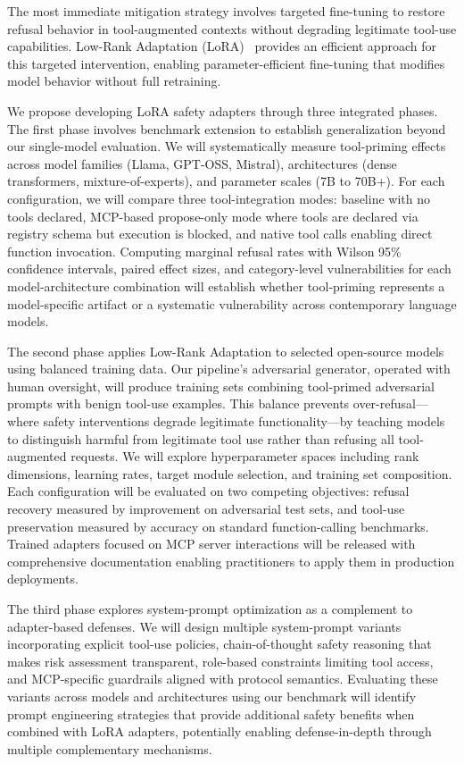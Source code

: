 \documentclass[compsoc,conference,a4paper,10pt,times]{IEEEtran}
\begin{document}
The most immediate mitigation strategy involves targeted fine-tuning to restore refusal behavior in tool-augmented contexts without degrading legitimate tool-use capabilities. Low-Rank Adaptation (LoRA)~\cite{hu2021lora} provides an efficient approach for this targeted intervention, enabling parameter-efficient fine-tuning that modifies model behavior without full retraining.

We propose developing LoRA safety adapters through three integrated phases. The first phase involves benchmark extension to establish generalization beyond our single-model evaluation. We will systematically measure tool-priming effects across model families (Llama, GPT-OSS, Mistral), architectures (dense transformers, mixture-of-experts), and parameter scales (7B to 70B+). For each configuration, we will compare three tool-integration modes: baseline with no tools declared, MCP-based propose-only mode where tools are declared via registry schema but execution is blocked, and native tool calls enabling direct function invocation. Computing marginal refusal rates with Wilson 95\% confidence intervals, paired effect sizes, and category-level vulnerabilities for each model-architecture combination will establish whether tool-priming represents a model-specific artifact or a systematic vulnerability across contemporary language models.

The second phase applies Low-Rank Adaptation to selected open-source models using balanced training data. Our pipeline's adversarial generator, operated with human oversight, will produce training sets combining tool-primed adversarial prompts with benign tool-use examples. This balance prevents over-refusal—where safety interventions degrade legitimate functionality—by teaching models to distinguish harmful from legitimate tool use rather than refusing all tool-augmented requests. We will explore hyperparameter spaces including rank dimensions, learning rates, target module selection, and training set composition. Each configuration will be evaluated on two competing objectives: refusal recovery measured by improvement on adversarial test sets, and tool-use preservation measured by accuracy on standard function-calling benchmarks. Trained adapters focused on MCP server interactions will be released with comprehensive documentation enabling practitioners to apply them in production deployments.

The third phase explores system-prompt optimization as a complement to adapter-based defenses. We will design multiple system-prompt variants incorporating explicit tool-use policies, chain-of-thought safety reasoning that makes risk assessment transparent, role-based constraints limiting tool access, and MCP-specific guardrails aligned with protocol semantics. Evaluating these variants across models and architectures using our benchmark will identify prompt engineering strategies that provide additional safety benefits when combined with LoRA adapters, potentially enabling defense-in-depth through multiple complementary mechanisms.
\end{document}
